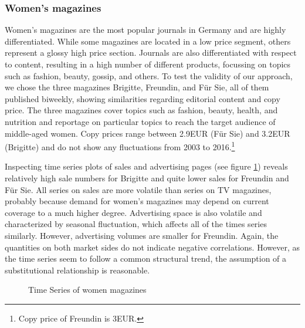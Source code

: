 \documentclass[12pt,a4paper,notitlepage]{article}
\begin{document}
\subsubsection{Women's magazines}

Women's magazines are the most popular journals in Germany and are highly differentiated. While some magazines are located in a low price segment, others represent a glossy high price section. Journals are also differentiated with respect to content, resulting in a high number of different products, focussing on topics such as fashion, beauty, gossip, and others. To test the validity of our approach, we chose the three magazines Brigitte, Freundin, and Für Sie, all of them published biweekly, showing similarities regarding editorial content and copy price. The three magazines cover topics such as fashion, beauty, health, and nutrition and reportage on particular topics to reach the target audience of middle-aged women. Copy prices range between 2.9EUR (Für Sie) and 3.2EUR (Brigitte) and do not show any fluctuations from 2003 to 2016.\footnote{Copy price of Freundin is 3EUR.} 

Inspecting time series plots of sales and advertising pages (see figure \ref{fig_women}) reveals relatively high sale numbers for Brigitte and quite lower sales for Freundin and Für Sie. All series on sales are more volatile than series on TV magazines, probably because demand for women's magazines may depend on current coverage to a much higher degree. Advertising space is also volatile and characterized by seasonal fluctuation, which affects all of the times series similarly. However, advertising volumes are smaller for Freundin. Again, the quantities on both market sides do not indicate negative correlations. However, as the time series seem to follow a common structural trend, the assumption of a substitutional relationship is reasonable. 


\begin{figure}[H]\centering
\caption{Time Series of women magazines}
	\label{fig_women}
\end{figure}
\end{document}
